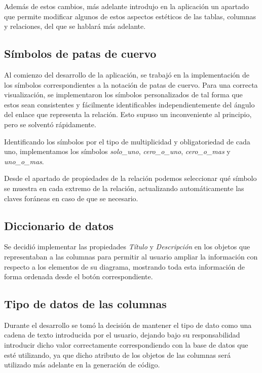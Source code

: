 Además de estos cambios, más adelante introdujo en la aplicación un apartado que permite modificar algunos de estos aspectos estéticos de las tablas, columnas y relaciones, del que se hablará más adelante.

\subsection{Símbolos de patas de cuervo}

Al comienzo del desarrollo de la aplicación, se trabajó en la implementación de los símbolos correspondientes a la notación de patas de cuervo. Para una correcta visualización, se implementaron los símbolos personalizados de tal forma que estos sean consistentes y fácilmente identificables independientemente del ángulo del enlace que representa la relación. Esto supuso un inconveniente al principio, pero se solventó rápidamente.


Identificando los símbolos por el tipo de multiplicidad y obligatoriedad de cada uno, implementamos los símbolos \textit{solo\_uno}, \textit{cero\_o\_uno}, \textit{cero\_o\_mas} y \textit{uno\_o\_mas}.

Desde el apartado de propiedades de la relación podemos seleccionar qué símbolo se muestra en cada extremo de la relación, actualizando automáticamente las claves foráneas en caso de que se necesario.

\subsection{Diccionario de datos}

Se decidió implementar las propiedades \emph{Título} y \emph{Descripción} en los objetos que representaban a las columnas para permitir al usuario ampliar la información con respecto a los elementos de su diagrama, mostrando toda esta información de forma ordenada desde el botón correspondiente.

\subsection{Tipo de datos de las columnas}

Durante el desarrollo se tomó la decisión de mantener el tipo de dato como una cadena de texto introducida por el usuario, dejando bajo su responsabilidad introducir dicho valor correctamente correspondiendo con la base de datos que esté utilizando, ya que dicho atributo de los objetos de las columnas será utilizado más adelante en la generación de código.

